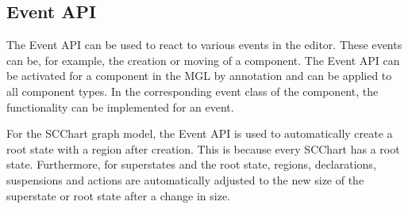 \subsection{Event API}
The Event API can be used to react to various events in the editor. These events can be, for example, the creation or moving of a component. The Event API can be activated for a component in the MGL by annotation and can be applied to all component types. In the corresponding event class of the component, the functionality can be implemented for an event.

For the SCChart graph model, the Event API is used to automatically create a root state with a region after creation. This is because every SCChart has a root state. Furthermore, for superstates and the root state, regions, declarations, suspensions and actions are automatically adjusted to the new size of the superstate or root state after a change in size. 



